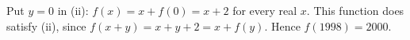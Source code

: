 Put $y=0$ in (ii): $f(x)=x+f(0)=x+2$ for every real $x$. This function does satisfy (ii), since $f(x+y)=x+y+2=x+f(y)$. Hence $f(1998)=\boxed{2000}$.
